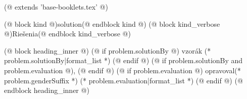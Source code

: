 (@ extends 'base-booklets.tex' @)

(@ block kind @)solution(@ endblock kind @)
(@ block kind_verbose @)Riešenia(@ endblock kind_verbose @)

(@ block heading_inner @)
    (@ if problem.solutionBy @)%
        vzorák (* problem.solutionBy|format_list *)%
    (@ endif @)%
    (@ if problem.solutionBy and problem.evaluation @), (@ endif @)%
    (@ if problem.evaluation @)%
        opravoval(* problem.genderSuffix *) (* problem.evaluation|format_list *)%
    (@ endif @)%
(@ endblock heading_inner @)

